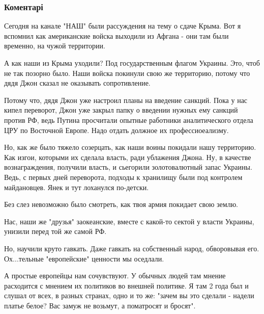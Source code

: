  
 
 
 
 
\subsubsection{Коментарі}

\begin{itemize} %

Сегодня на канале "НАШ" были рассуждения на тему о сдаче Крыма. Вот я вспомнил
как американские войска выходили из Афгана - они там были временно, на чужой
территории.

А как наши из Крыма уходили? Под государственным флагом Украины. Это, чтоб не
так позорно было. Наши войска покинули свою же территорию, потому что дядя Джон
сказал не оказывать сопротивление.

Потому что, дядя Джон уже настроил планы на введение санкций. Пока у нас кипел
переворот, Джон уже закрыл папку о введении нужных ему санкций против РФ, ведь
Путина просчитали опытные работники аналитического отдела ЦРУ по Восточной
Европе. Надо отдать должное их профессиоеализму.

Но, как же было тяжело созерцать, как наши воины покидали нашу территорию. Как
изгои, которыми их сделала власть, ради ублажения Джона. Ну, в качестве
вознаграждения, получили власть, и сьегорили золотовалютный запас Украины.
Ведь, с первых дней переворота, подходы к хранилищу были под контролем
майдановцев. Янек и тут лоханулся по-детски.

Без слез невозможно было смотреть, как твоя армия покидает свою землю.

Нас, наши же "друзья" заокеанские, вместе с какой-то сектой у власти Украины,
унизили перед той же самой РФ.

Но, научили круто гавкать. Даже гавкать на собственный народ, обворовывая его.
Ох...тельные "европейские" ценности мы оседлали.

А простые европейцы нам сочувствуют. У обычных людей там мнение расходится с
мнением их политиков во внешней политике. Я там 2 года был и слушал от всех, в
разных странах, одно и то же: "зачем вы это сделали - надели платье белое? Вас
замуж не возьмут, а поматросят и бросят".


\end{itemize}
